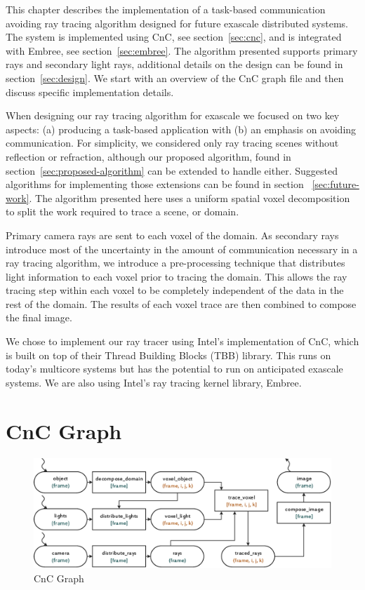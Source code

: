 \label{sec:implementation}

This chapter describes the implementation of a task-based communication avoiding
ray tracing algorithm designed for future exascale distributed systems. The
system is implemented using CnC, see section~\ref{sec:cnc}, and is integrated
with Embree, see section~\ref{sec:embree}.  The algorithm presented supports 
primary rays and secondary light rays, additional details on the design can be 
found in section~\ref{sec:design}.  We start with an overview of the CnC graph 
file and then discuss specific implementation details.

When designing our ray tracing algorithm for exascale we focused on two key 
aspects: (a) producing a task-based application with (b) an emphasis on avoiding
communication. For simplicity, we considered only ray tracing scenes without
reflection or refraction, although our proposed algorithm, found in 
section~\ref{sec:proposed-algorithm} can be extended to handle either.  
Suggested algorithms for implementing those extensions can be found in section 
~\ref{sec:future-work}. The algorithm presented here uses a uniform spatial 
voxel decomposition to split the work required to trace a scene, or domain.

Primary camera rays are sent to each voxel of the domain.  As secondary rays 
introduce most of the uncertainty in the amount of communication necessary in a 
ray tracing algorithm, we introduce a pre-processing technique that distributes
light information to each voxel prior to tracing the domain. This allows the ray
tracing step within each voxel to be completely independent of the data in the 
rest of the domain. The results of each voxel trace are then combined to compose 
the final image.

We chose to implement our ray tracer using Intel’s implementation of CnC, 
which is built on top of their Thread Building Blocks (TBB) library. This runs 
on today’s multicore systems but has the potential to run on anticipated 
exascale systems.  We are also using Intel’s ray tracing kernel library, 
Embree.

\section{CnC Graph}

\begin{figure}[t]
  \centering
  \includegraphics[width=\textwidth]{drawings/CnC.pdf}
  \caption{CnC Graph}
  \label{fig:cnc}
\end{figure}

